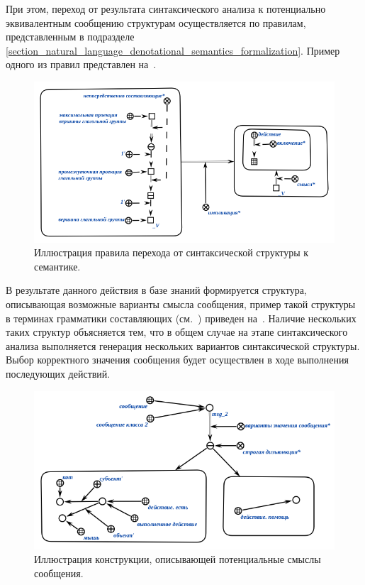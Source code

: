 При этом, переход от результата синтаксического анализа к потенциально эквивалентным сообщению структурам осуществляется по правилам, представленным в подразделе \ref{section_natural_language_denotational_semantics_formalization}.
Пример одного из правил представлен на~\textit{}.

\begin{figure}[h]
    \centering
    \includegraphics[scale=0.8]{images/part4/chapter_nl_interfaces/d_sem_3}
    \caption{Иллюстрация правила перехода от синтаксической структуры к семантике.}
    \label{fig:transition_to_semanic_rule}
\end{figure}

В результате данного действия в базе знаний формируется структура, описывающая возможные варианты смысла сообщения, пример такой структуры в терминах грамматики составляющих (см.~) приведен на~\textit{}.
Наличие нескольких таких структур объясняется тем, что в общем случае на этапе синтаксического анализа выполняется генерация нескольких вариантов синтаксической структуры.
Выбор корректного значения сообщения будет осуществлен в ходе выполнения последующих действий.

\begin{figure}[h]
    \centering
    \includegraphics[scale=0.8]{images/part4/chapter_nl_interfaces/messsage_meaning_variants}
    \caption{Иллюстрация конструкции, описывающей потенциальные смыслы сообщения.}
    \label{fig:messsage_meaning_variants}
\end{figure}

